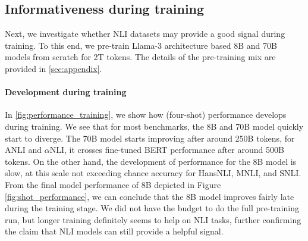 \subsection{Informativeness during training}\label{subsec:during_training}

Next, we investigate whether NLI datasets may provide a good signal during training.
To this end, we pre-train Llama-3 architecture based 8B and 70B models from scratch for 2T tokens.
The details of the pre-training mix are provided in \cref{sec:appendix}. 

\paragraph{Development during training} In \cref{fig:performance_training}, we show how (four-shot) performance develops during training.
We see that for most benchmarks, the 8B and 70B model quickly start to diverge.
The 70B model starts improving after around 250B tokens, for ANLI and $\alpha$NLI, it crosses fine-tuned BERT performance after around 500B tokens.
On the other hand, the development of performance for the 8B model is slow, at this scale not exceeding chance accuracy for HansNLI, MNLI, and SNLI.
From the final model performance of 8B depicted in Figure \cref{fig:shot_performance}, we can conclude that the 8B model improves fairly late during the training stage.
We did not have the budget to do the full pre-training run, but longer training definitely seems to help on NLI tasks, further confirming the claim that NLI models can still provide a helpful signal.

